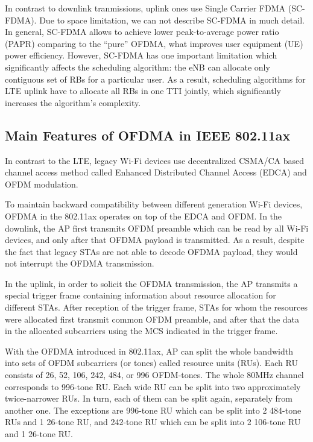 \documentclass[conference]{IEEEtran}
\begin{document}
In contrast to downlink tranmissions, uplink  ones use Single Carrier FDMA (SC-FDMA). Due to space limitation, we can not describe SC-FDMA in much detail. In general, SC-FDMA allows to achieve lower peak-to-average power ratio (PAPR) comparing to the ``pure'' OFDMA, what improves user equipment (UE) power efficiency. However, SC-FDMA has one important limitation which significantly affects the scheduling algorithm: the eNB can allocate only contiguous set of RBs for a particular user. As a result, scheduling algorithms for LTE uplink have to allocate all RBs in one TTI jointly, which significantly increases the algorithm's complexity.

\subsection{Main Features of OFDMA in IEEE 802.11ax}





In contrast to the LTE, legacy Wi-Fi devices use decentralized CSMA/CA based channel access method called Enhanced Distributed Channel Access (EDCA) and OFDM modulation. 

To maintain backward compatibility between different generation Wi-Fi devices,  OFDMA in the 802.11ax operates on top of the EDCA and OFDM. In the downlink, the AP first transmits OFDM preamble which can be read by all Wi-Fi devices, and only after that OFDMA payload is transmitted. As a result, despite the fact that legacy STAs are not able to decode OFDMA payload, they would not interrupt the OFDMA transmission.

In the uplink, in order to solicit the OFDMA transmission, the AP transmits a special trigger frame containing information about resource allocation for different STAs. After reception of the trigger frame, STAs for whom the resources were allocated first transmit common OFDM preamble, and after that the data in the allocated subcarriers using the MCS indicated in the trigger frame. 

With the OFDMA introduced in 802.11ax, AP can split the whole bandwidth into sets of OFDM subcarriers (or tones) called resource units (RUs). Each RU consists of 26, 52, 106, 242, 484, or 996 OFDM-tones. The whole 80MHz channel corresponds to 996-tone RU. Each wide RU can be split into two approximately twice-narrower RUs. In turn, each of them can be split again, separately from another one. The exceptions are 996-tone RU which can be split into 2 484-tone RUs and 1 26-tone RU, and 242-tone RU which can be split into 2 106-tone RU and 1 26-tone RU.
\end{document}
